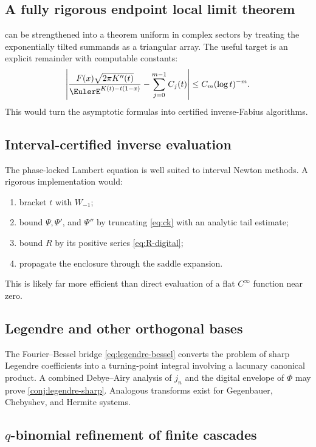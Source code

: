 \documentclass[11pt,oneside]{article}
\theoremstyle{definition}
\theoremstyle{remark}
\begin{document}
\subsection{A fully rigorous endpoint local limit theorem}

 can be strengthened into a theorem uniform in
complex sectors by treating the exponentially tilted summands as a triangular
array.  The useful target is an explicit remainder with computable constants:
\[
 \left|
 \frac{F(x)\sqrt{2\pi K''(t)}}
      {\EulerE^{K(t)-t(1-x)}}
 -\sum_{j=0}^{m-1}C_j(t)
 \right|
 \leq C_m(\log t)^{-m}.
\]
This would turn the asymptotic formulas into certified inverse-Fabius
algorithms.

\subsection{Interval-certified inverse evaluation}

The phase-locked Lambert equation is well suited to interval Newton methods.
A rigorous implementation would:
\begin{enumerate}[label=\arabic*.,leftmargin=2em]
\item bracket \(t\) with \(W_{-1}\);
\item bound \(\Psi,\Psi'\), and \(\Psi''\) by truncating
      \eqref{eq:ck} with an analytic tail estimate;
\item bound \(R\) by its positive series \eqref{eq:R-digital};
\item propagate the enclosure through the saddle expansion.
\end{enumerate}
This is likely far more efficient than direct evaluation of a flat
\(C^\infty\) function near zero.

\subsection{Legendre and other orthogonal bases}

The Fourier--Bessel bridge \eqref{eq:legendre-bessel} converts the problem of
sharp Legendre coefficients into a turning-point integral involving a
lacunary canonical product.  A combined Debye--Airy analysis of \(j_n\) and
the digital envelope of \(\Phi\) may prove \cref{conj:legendre-sharp}.
Analogous transforms exist for Gegenbauer, Chebyshev, and Hermite systems.

\subsection{\(q\)-binomial refinement of finite cascades}
\end{document}

